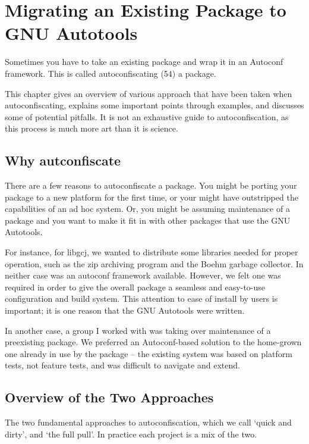 \chapter{Migrating an Existing Package to GNU Autotools}

Sometimes you have to take an existing package and wrap it in an Autoconf framework. This is called autoconfiscating (54) a package.

This chapter gives an overview of various approach that have been taken when autoconfiscating, explains some important points through examples, and discusses some of potential pitfalls. It is not an exhaustive guide to autoconfiscation, as this process is much more art than it is science. 

\section{Why autconfiscate}

There are a few reasons to autoconfiscate a package. You might be porting your package to a new platform for the first time, or your might have outstripped the capabilities of an ad hoc system. Or, you might be assuming maintenance of a package and you want to make it fit in with other packages that use the GNU Autotools.

For instance, for libgcj, we wanted to distribute some libraries needed for proper operation, such as the zip archiving program and the Boehm garbage collector. In neither case was an autoconf framework available. However, we felt one was required in order to give the overall package a seamless and easy-to-use configuration and build system. This attention to ease of install by users is important; it is one reason that the GNU Autotools were written.

In another case, a group I worked with was taking over maintenance of a preexisting package. We preferred an Autoconf-based solution to the home-grown one already in use by the package -- the existing system was based on platform tests, not feature tests, and was difficult to navigate and extend. 

\section{Overview of the Two Approaches}

The two fundamental approaches to autoconfiscation, which we call `quick and dirty', and `the full pull'. In practice each project is a mix of the two.

